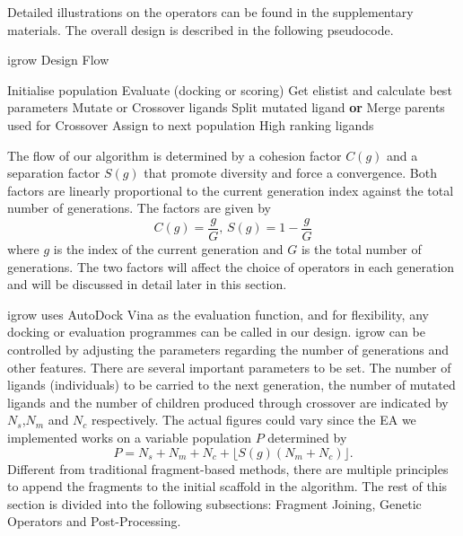 \documentclass[10pt,conference,letterpaper]{IEEEtran}
\begin{document}
Detailed illustrations on the operators can be found in the supplementary materials.
The overall design is described in the following pseudocode.
\begin{algorithm}
\caption{igrow Design Flow}
\label{alg:overall_design}
\begin{algorithmic}[1]
\STATE Initialise population
	\STATE Evaluate (docking or scoring)
	\STATE Get elistist and calculate best parameters
	\STATE Mutate or Crossover ligands
		\STATE Split mutated ligand {\bfseries or}
		\STATE Merge parents used for Crossover
	\ENDIF
	\ENDFOR
		\STATE Assign to next population
	\ENDIF
\ENDFOR
\RETURN High ranking ligands
\end{algorithmic}
\end{algorithm}

The flow of our algorithm is determined by a cohesion factor $C(g)$ and a separation factor $S(g)$ that promote diversity and force a convergence.
Both factors are linearly proportional to the current generation index against the total number of generations.
The factors are given by
\begin{equation}
C(g) = \frac{g}{G},\,S(g) = 1 - \frac{g}{G} \label{eqn:01}
\end{equation}
where $g$ is the index of the current generation and $G$ is the total number of generations.
The two factors will affect the choice of operators in each generation and will be discussed in detail later in this section.

igrow uses AutoDock Vina \cite{ref18} as the evaluation function, and for flexibility, any docking or evaluation programmes can be called in our design.
igrow can be controlled by adjusting the parameters regarding the number of generations and other features.
There are several important parameters to be set.
The number of ligands (individuals) to be carried to the next generation, the number of mutated ligands and the number of children produced through crossover are indicated by $N_{s}$,$N_{m}$ and $N_{c}$ respectively.
The actual figures could vary since the EA we implemented works on a variable population $P$ determined by
\begin{equation}
P=N_{s}+N_{m}+N_{c}+\lfloor S(g)(N_{m}+N_{c})\rfloor. \label{eqn:02}
\end{equation}
Different from traditional fragment-based methods, there are multiple principles to append the fragments to the initial scaffold in the algorithm.
The rest of this section is divided into the following subsections: Fragment Joining, Genetic Operators and Post-Processing.
\end{document}
